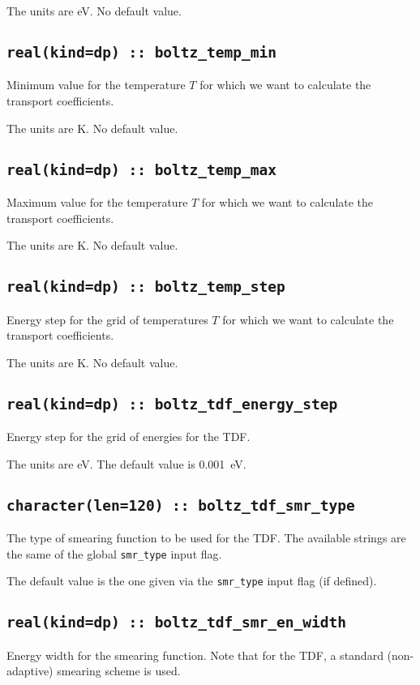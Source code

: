 The units are eV.
No default value.

\subsection[boltz\_temp\_min]{\tt real(kind=dp) :: boltz\_temp\_min}
Minimum value for the temperature $T$ for which we want to calculate the transport coefficients.

The units are K.
No default value.

\subsection[boltz\_temp\_max]{\tt real(kind=dp) :: boltz\_temp\_max}
Maximum value for the temperature $T$ for which we want to calculate the transport coefficients.

The units are K.
No default value.

\subsection[boltz\_temp\_step]{\tt real(kind=dp) :: boltz\_temp\_step}
Energy step for the grid of temperatures $T$ for which we want to calculate the transport coefficients.

The units are K.
No default value.

\subsection[boltz\_tdf\_energy\_step]{\tt real(kind=dp) :: boltz\_tdf\_energy\_step}
Energy step for the grid of energies for the TDF.

The units are eV.
The default value is 0.001~eV.

\subsection[boltz\_tdf\_smr\_type]{\tt character(len=120) :: boltz\_tdf\_smr\_type}
The type of smearing function to be used for the TDF. The available strings are the same of the global {\tt smr\_type} input flag. 

The default value is the one given via the {\tt smr\_type} input flag (if defined).

\subsection[boltz\_tdf\_smr\_en\_width]{\tt real(kind=dp) :: boltz\_tdf\_smr\_en\_width}
Energy width for the smearing function. Note that for the TDF, a standard (non-adaptive) smearing scheme is used.

